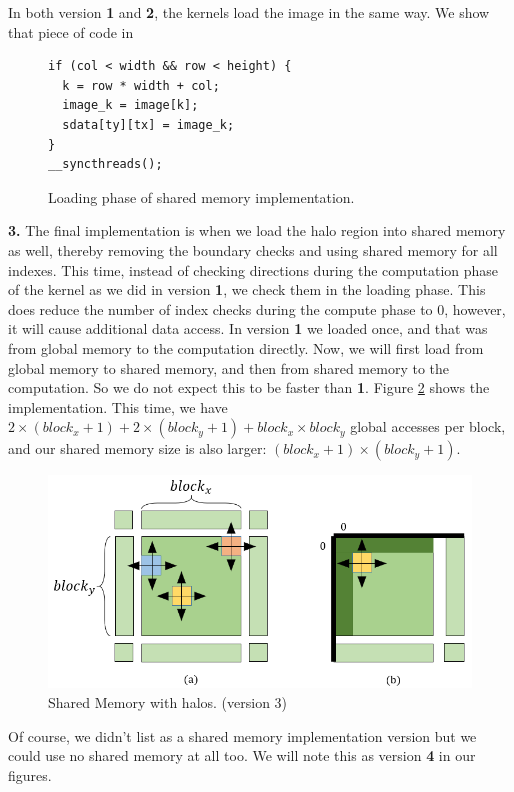 \documentclass[12pt,reqno]{amsart}
\begin{document}
In both version \textbf{1} and \textbf{2}, the kernels load the image in the same way. We show that piece of code in 
\begin{figure}[h]
\centering
\begin{lstlisting}
if (col < width && row < height) {
  k = row * width + col;
  image_k = image[k];
  sdata[ty][tx] = image_k;
}
__syncthreads();
\end{lstlisting}
\caption{Loading phase of shared memory implementation.}
\label{fig:reduc_2}
\end{figure}

\textbf{3. } The final implementation is when we load the halo region into shared memory as well, thereby removing the boundary checks and using shared memory for all indexes. This time, instead of checking directions during the computation phase of the kernel as we did in version \textbf{1}, we check them in the loading phase. This does reduce the number of index checks during the compute phase to 0, however, it will cause additional data access. In version \textbf{1} we loaded once, and that was from global memory to the computation directly. Now, we will first load from global memory to shared memory, and then from shared memory to the computation. So we do not expect this to be faster than \textbf{1}. Figure \ref{fig:shmem3} shows the implementation. This time, we have $2 \times (block_x+1) + 2 \times (block_y+1) + block_x \times block_y$ global accesses per block, and our shared memory size is also larger: $(block_x+1) \times (block_y+1)$. 

\begin{figure}[h]
\centering
\includegraphics[width=0.9\linewidth]{shmemaccessv3.png}
\caption{Shared Memory with halos. (version 3)}
\label{fig:shmem3}
\end{figure}

Of course, we didn't list as a shared memory implementation version but we could use no shared memory at all too. We will note this as version \textbf{4} in our figures.
\end{document}

